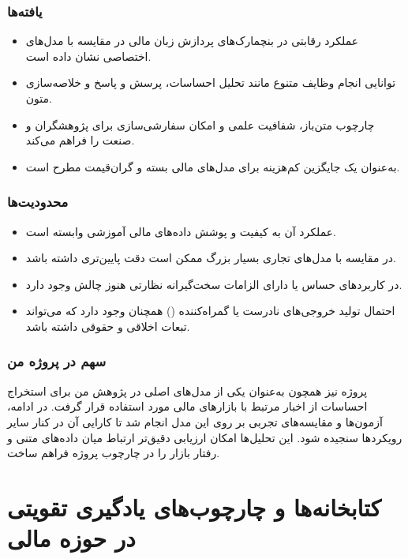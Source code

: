 \documentclass[12pt, a4paper]{report}
\begin{document}
\subsubsection{یافته‌ها}
\begin{itemize}
    \item عملکرد رقابتی در بنچمارک‌های پردازش زبان مالی در مقایسه با مدل‌های اختصاصی نشان داده است.  
    \item توانایی انجام وظایف متنوع مانند تحلیل احساسات، پرسش و پاسخ و خلاصه‌سازی متون.  
    \item چارچوب متن‌باز، شفافیت علمی و امکان سفارشی‌سازی برای پژوهشگران و صنعت را فراهم می‌کند.  
    \item به‌عنوان یک جایگزین کم‌هزینه برای مدل‌های مالی بسته و گران‌قیمت مطرح است.  
\end{itemize}

\subsubsection{محدودیت‌ها}
\begin{itemize}
    \item عملکرد آن به کیفیت و پوشش داده‌های مالی آموزشی وابسته است.  
    \item در مقایسه با مدل‌های تجاری بسیار بزرگ ممکن است دقت پایین‌تری داشته باشد.  
    \item در کاربردهای حساس یا دارای الزامات سخت‌گیرانه نظارتی هنوز چالش وجود دارد.  
    \item احتمال تولید خروجی‌های نادرست یا گمراه‌کننده () همچنان وجود دارد که می‌تواند تبعات اخلاقی و حقوقی داشته باشد.  
\end{itemize}

\subsubsection{سهم در پروژه من}
پروژه  نیز همچون  به‌عنوان یکی از مدل‌های اصلی در پژوهش من برای استخراج احساسات از اخبار مرتبط با بازارهای مالی مورد استفاده قرار گرفت. در ادامه، آزمون‌ها و مقایسه‌های تجربی بر روی این مدل انجام شد تا کارایی آن در کنار سایر رویکردها سنجیده شود. این تحلیل‌ها امکان ارزیابی دقیق‌تر ارتباط میان داده‌های متنی و رفتار بازار را در چارچوب پروژه فراهم ساخت.

\section{کتابخانه‌ها و چارچوب‌های یادگیری تقویتی در حوزه مالی}
\subsection{ \cite{pricope2021deep}}
\end{document}
